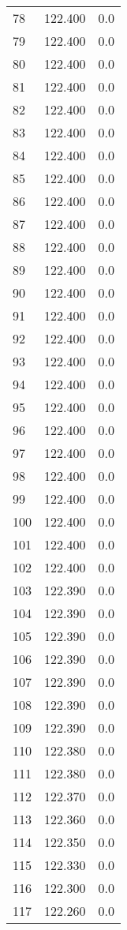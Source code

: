\begin{tabular}{lrr}
78  &  122.400 &   0.0 \\
79  &  122.400 &   0.0 \\
80  &  122.400 &   0.0 \\
81  &  122.400 &   0.0 \\
82  &  122.400 &   0.0 \\
83  &  122.400 &   0.0 \\
84  &  122.400 &   0.0 \\
85  &  122.400 &   0.0 \\
86  &  122.400 &   0.0 \\
87  &  122.400 &   0.0 \\
88  &  122.400 &   0.0 \\
89  &  122.400 &   0.0 \\
90  &  122.400 &   0.0 \\
91  &  122.400 &   0.0 \\
92  &  122.400 &   0.0 \\
93  &  122.400 &   0.0 \\
94  &  122.400 &   0.0 \\
95  &  122.400 &   0.0 \\
96  &  122.400 &   0.0 \\
97  &  122.400 &   0.0 \\
98  &  122.400 &   0.0 \\
99  &  122.400 &   0.0 \\
100 &  122.400 &   0.0 \\
101 &  122.400 &   0.0 \\
102 &  122.400 &   0.0 \\
103 &  122.390 &   0.0 \\
104 &  122.390 &   0.0 \\
105 &  122.390 &   0.0 \\
106 &  122.390 &   0.0 \\
107 &  122.390 &   0.0 \\
108 &  122.390 &   0.0 \\
109 &  122.390 &   0.0 \\
110 &  122.380 &   0.0 \\
111 &  122.380 &   0.0 \\
112 &  122.370 &   0.0 \\
113 &  122.360 &   0.0 \\
114 &  122.350 &   0.0 \\
115 &  122.330 &   0.0 \\
116 &  122.300 &   0.0 \\
117 &  122.260 &   0.0 \\

\end{tabular}
